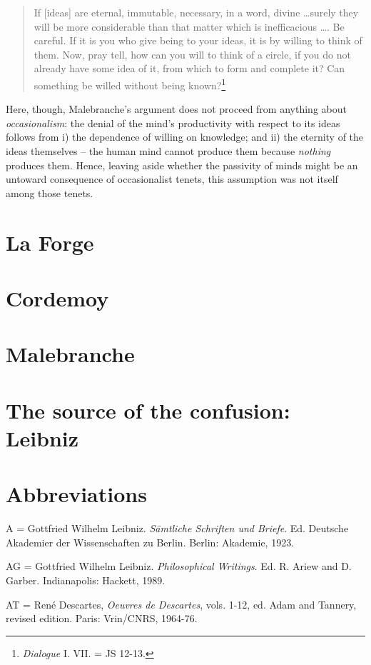 \documentclass[]{article}
\begin{document}
\begin{quote}
	If [ideas] are eternal, immutable, necessary, in a word, divine \ldots surely they will be more considerable than that matter which is inefficacious \ldots. Be careful. If it is you who give being to your ideas, it is by willing to think of them. Now, pray tell, how can you will to think of a circle, if you do not already have some idea of it, from which to form and complete it? Can something be willed without being known?\footnote{\emph{Dialogue} I. VII. = JS 12-13.}
\end{quote}

Here, though, Malebranche's argument does not proceed from anything about \emph{occasionalism}: the denial of the mind's productivity with respect to its ideas follows from i) the dependence of willing on knowledge; and ii) the eternity of the ideas themselves -- the human mind cannot produce them because \emph{nothing} produces them. Hence, leaving aside whether the passivity of minds might be an untoward consequence of occasionalist tenets, this assumption was not itself among those tenets.
\section{La Forge}
\section{Cordemoy}
\section{Malebranche}
\section{The source of the confusion: Leibniz}
\section{Abbreviations}

A = Gottfried Wilhelm Leibniz. \emph{Sämtliche Schriften und Briefe}.
Ed. Deutsche Akademier der Wissenschaften zu Berlin. Berlin: Akademie,
1923.

AG = Gottfried Wilhelm Leibniz. \emph{Philosophical Writings}. Ed. R.
Ariew and D. Garber. Indianapolis: Hackett, 1989.

AT = René Descartes, \emph{Oeuvres de Descartes}, vols. 1-12, ed. Adam
and Tannery, revised edition. Paris: Vrin/CNRS, 1964-76.
\end{document}

